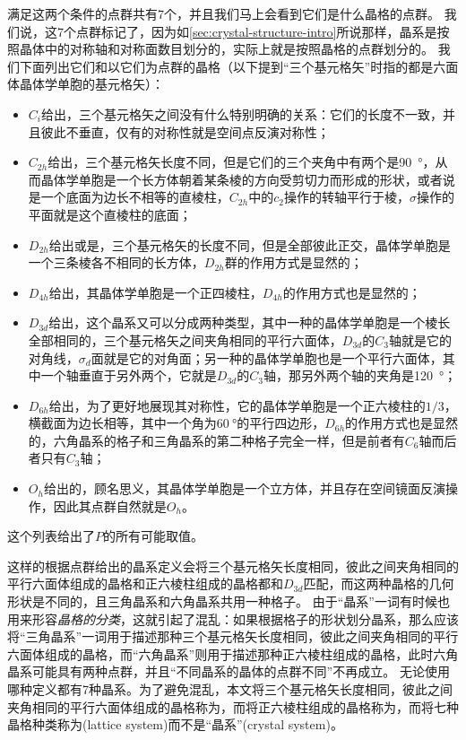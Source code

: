满足这两个条件的点群共有7个，并且我们马上会看到它们是什么晶格的点群。
我们说，这7个点群标记了，因为如\autoref{sec:crystal-structure-intro}所说那样，晶系是按照晶体中的对称轴和对称面数目划分的，实际上就是按照晶格的点群划分的。
我们下面列出它们和以它们为点群的晶格（以下提到“三个基元格矢”时指的都是六面体晶体学单胞的基元格矢）：
\begin{itemize}
    \item $C_i$给出，三个基元格矢之间没有什么特别明确的关系：它们的长度不一致，并且彼此不垂直，仅有的对称性就是空间点反演对称性；
    \item $C_{2h}$给出，三个基元格矢长度不同，但是它们的三个夹角中有两个是\SI{90}{\degree}，从而晶体学单胞是一个长方体朝着某条棱的方向受剪切力而形成的形状，或者说是一个底面为边长不相等的直棱柱，$C_{2h}$中的$c_2$操作的转轴平行于棱，$\sigma$操作的平面就是这个直棱柱的底面；
    \item $D_{2h}$给出或是，三个基元格矢的长度不同，但是全部彼此正交，晶体学单胞是一个三条棱各不相同的长方体，$D_{2h}$群的作用方式是显然的；
    \item $D_{4h}$给出，其晶体学单胞是一个正四棱柱，$D_{4h}$的作用方式也是显然的；
    \item $D_{3d}$给出，这个晶系又可以分成两种类型，其中一种的晶体学单胞是一个棱长全部相同的，三个基元格矢之间夹角相同的平行六面体，$D_{3d}$的$C_3$轴就是它的对角线，$\sigma_d$面就是它的对角面；另一种的晶体学单胞也是一个平行六面体，其中一个轴垂直于另外两个，它就是$D_{3d}$的$C_3$轴，那另外两个轴的夹角是\SI{120}{\degree}；
    \item $D_{6h}$给出，为了更好地展现其对称性，它的晶体学单胞是一个正六棱柱的$1/3$，横截面为边长相等，其中一个角为$\SI{60}{\degree}$的平行四边形，$D_{6h}$的作用方式也是显然的，六角晶系的格子和三角晶系的第二种格子完全一样，但是前者有$C_6$轴而后者只有$C_3$轴；
    \item $O_h$给出的，顾名思义，其晶体学单胞是一个立方体，并且存在空间镜面反演操作，因此其点群自然就是$O_h$。
\end{itemize}
这个列表给出了$P$的所有可能取值。

这样的根据点群给出的晶系定义会将三个基元格矢长度相同，彼此之间夹角相同的平行六面体组成的晶格和正六棱柱组成的晶格都和$D_{3d}$匹配，而这两种晶格的几何形状是不同的，且三角晶系和六角晶系共用一种格子。
由于“晶系”一词有时候也用来形容\emph{晶格的分类}，这就引起了混乱：如果根据格子的形状划分晶系，那么应该将“三角晶系”一词用于描述那种三个基元格矢长度相同，彼此之间夹角相同的平行六面体组成的晶格，而“六角晶系”则用于描述那种正六棱柱组成的晶格，此时六角晶系可能具有两种点群，并且“不同晶系的晶体的点群不同”不再成立。
无论使用哪种定义都有7种晶系。为了避免混乱，本文将三个基元格矢长度相同，彼此之间夹角相同的平行六面体组成的晶格称为，而将正六棱柱组成的晶格称为，而将七种晶格种类称为(lattice system)而不是“晶系”(crystal system)。

